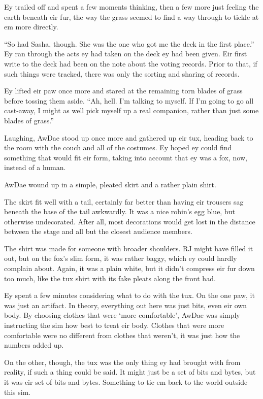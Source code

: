 Ey trailed off and spent a few moments thinking, then a few more just feeling the earth beneath eir fur, the way the grass seemed to find a way through to tickle at em more directly.

``So had Sasha, though.  She was the one who got me the deck in the first place.''  Ey ran through the acts ey had taken on the deck ey had been given.  Eir first write to the deck had been on the note about the voting records.  Prior to that, if such things were tracked, there was only the sorting and sharing of records.

Ey lifted eir paw once more and stared at the remaining torn blades of grass before tossing them aside.  ``Ah, hell.  I'm talking to myself.  If I'm going to go all cast-away, I might as well pick myself up a real companion, rather than just some blades of grass.''

Laughing, AwDae stood up once more and gathered up eir tux, heading back to the room with the couch and all of the costumes.  Ey hoped ey could find something that would fit eir form, taking into account that ey was a fox, now, instead of a human.

\secdiv

AwDae wound up in a simple, pleated skirt and a rather plain shirt.

The skirt fit well with a tail, certainly far better than having eir trousers sag beneath the base of the tail awkwardly.  It was a nice robin's egg blue, but otherwise undecorated.  After all, most decorations would get lost in the distance between the stage and all but the closest audience members.

The shirt was made for someone with broader shoulders.  RJ might have filled it out, but on the fox's slim form, it was rather baggy, which ey could hardly complain about.  Again, it was a plain white, but it didn't compress eir fur down too much, like the tux shirt with its fake pleats along the front had.


Ey spent a few minutes considering what to do with the tux.  On the one paw, it was just an artifact.  In theory, everything out here was just bits, even eir own body.  By choosing clothes that were `more comfortable', AwDae was simply instructing the sim how best to treat eir body.  Clothes that were more comfortable were no different from clothes that weren't, it was just how the numbers added up.

On the other, though, the tux was the only thing ey had brought with from reality, if such a thing could be said.  It might just be a set of bits and bytes, but it was eir set of bits and bytes.  Something to tie em back to the world outside this sim.

